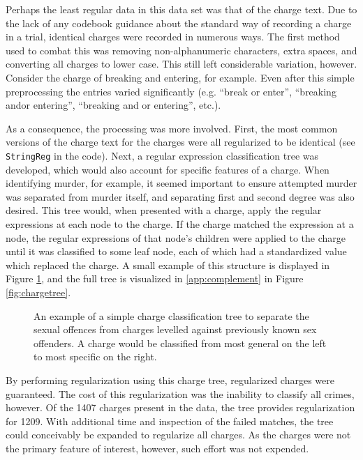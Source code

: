 Perhaps the least regular data in this data set was that of the charge text. Due to the lack of any codebook guidance about the
standard way of recording a charge in a trial, identical charges were recorded in numerous ways. The first method used to combat
this was removing non-alphanumeric characters, extra spaces, and converting all charges to lower case. This still left
considerable variation, however. Consider the charge of breaking and entering, for example. Even after this simple preprocessing
the entries varied significantly (e.g. ``break or enter'', ``breaking andor entering'', ``breaking and or entering'',
etc.).

As a consequence, the processing was more involved. First, the most common versions of the charge text for the charges were all
regularized to be identical (see \texttt{StringReg} in the code). Next, a regular expression classification tree was developed,
which would also account for specific features of a charge. When identifying murder, for example, it seemed important to ensure
attempted murder was separated from murder itself, and separating first and second degree was also desired. This tree would, when
presented with a charge, apply the regular expressions at each node to the charge. If the charge matched the expression at a node,
the regular expressions of that node's children were applied to the charge until it was classified to some leaf node, each of
which had a standardized value which replaced the charge. A small example of this structure is displayed in Figure
\ref{fig:exampletree}, and the full tree is visualized in \ref{app:complement} in Figure \ref{fig:chargetree}.

\begin{figure}[!h]
  \centering
  \caption[Charge Tree Example]{\footnotesize An example of a simple charge classification tree to separate the sexual offences from
    charges levelled against previously known sex offenders. A charge would be classified from most general on the left to most
    specific on the right.}
  \label{fig:exampletree}
\end{figure}

By performing regularization using this charge tree, regularized charges were guaranteed. The cost of this regularization was the
inability to classify all crimes, however. Of the 1407 charges present in the data, the tree provides regularization for
1209. With additional time and inspection of the failed matches, the tree could conceivably be expanded to regularize all
charges. As the charges were not the primary feature of interest, however, such effort was not expended.

